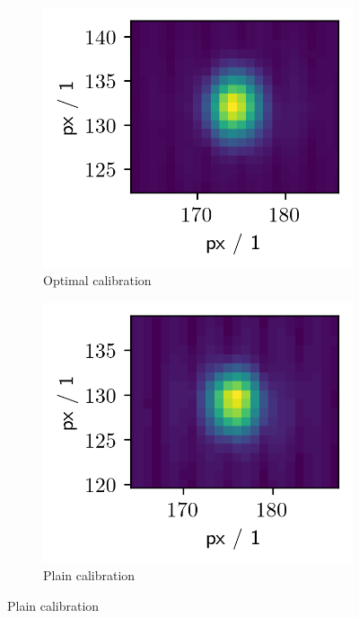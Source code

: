 \documentclass[twoside,openright,listof=numbered]{scrreprt}
\begin{document}
\begin{figure}[hbtp]
\centering
\begin{subfigure}[b]{0.32\linewidth}
\includegraphics[scale=1]{images/CalibComparison/fullOptimizedComparisonCalib.png} 
\caption{Optimal calibration}
\end{subfigure}\hfill
\begin{subfigure}[b]{0.32\linewidth}
\includegraphics[scale=1]{images/CalibComparison/betterComparisonCalib.png} 
\caption{Plain calibration}
\end{subfigure}\hfill

\end{figure}
\end{document}
